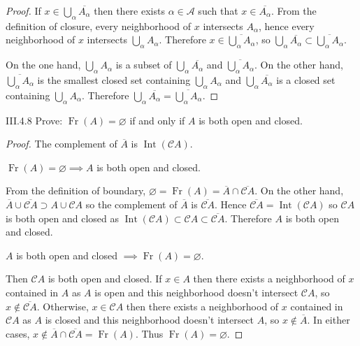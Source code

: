 \begin{proof}
	If \( x \in \bigcup_{\alpha} \overline{A_{\alpha}} \) then there exists \( \alpha \in \mathscr{A} \) such that \( x \in \overline{A_{\alpha}} \). From the definition of closure, every neighborhood of \(x\) intersects \( A_{\alpha} \), hence every neighborhood of \(x\) intersects \( \bigcup_{\alpha} A_{\alpha} \). Therefore \( x \in \overline{\bigcup_{\alpha} A_{\alpha}} \), so \( \bigcup_{\alpha} \overline{A_{\alpha}} \subset \overline{\bigcup_{\alpha} A_{\alpha}} \).

	On the one hand, \( \bigcup_{\alpha} A_{\alpha} \) is a subset of \( \bigcup_{\alpha} \overline{A_{\alpha}} \) and \( \overline{\bigcup_{\alpha} A_{\alpha}} \). On the other hand, \( \overline{\bigcup_{\alpha} A_{\alpha}} \) is the smallest closed set containing \( \bigcup_{\alpha} A_{\alpha} \) and \( \bigcup_{\alpha} \overline{A_{\alpha}} \) is a closed set containing \( \bigcup_{\alpha} A_{\alpha} \). Therefore \( \bigcup_{\alpha} \overline{A_{\alpha}} = \overline{\bigcup_{\alpha} A_{\alpha}} \).
\end{proof}

\begin{problem}{III.4.8}
Prove: \( \operatorname{Fr}(A) = \varnothing \) if and only if \(A\) is both open and closed.
\end{problem}

\begin{proof}
	The complement of \( \overline{A} \) is \( \operatorname{Int}(\mathscr{C}A) \).

	\( \operatorname{Fr}(A) = \varnothing \implies A \) is both open and closed.

	From the definition of boundary, \( \varnothing = \operatorname{Fr}(A) = \overline{A} \cap \overline{\mathscr{C}A} \). On the other hand, \( \overline{A} \cup \overline{\mathscr{C}A} \supset A \cup \mathscr{C}A \) so the complement of \( \overline{A} \) is \( \overline{\mathscr{C}A} \). Hence \( \overline{\mathscr{C}A} = \operatorname{Int}(\mathscr{C}A) \) so \( \mathscr{C}A \) is both open and closed as \( \operatorname{Int}(\mathscr{C}A) \subset \mathscr{C}A \subset \overline{\mathscr{C}A} \). Therefore \(A\) is both open and closed.

	\( A \) is both open and closed \( \implies \operatorname{Fr}(A) = \varnothing \).

	Then \( \mathscr{C}A \) is both open and closed. If \( x \in A \) then there exists a neighborhood of \(x\) contained in \(A\) as \(A\) is open and this neighborhood doesn't intersect \(\mathscr{C}A\), so \( x \notin \overline{\mathscr{C}A} \). Otherwise, \( x \in \mathscr{C}A \) then there exists a neighborhood of \(x\) contained in \(\mathscr{C}A\) as \( A \) is closed and this neighborhood doesn't intersect \(A\), so \( x \notin \overline{A} \). In either cases, \( x \notin \overline{A} \cap \overline{\mathscr{C}A} = \operatorname{Fr}(A) \). Thus \( \operatorname{Fr}(A) = \varnothing \).
\end{proof}

